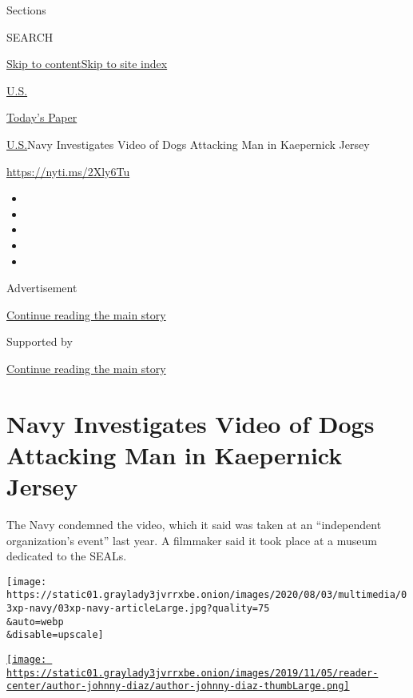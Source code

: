 Sections

SEARCH

\protect\hyperlink{site-content}{Skip to
content}\protect\hyperlink{site-index}{Skip to site index}

\href{https://www.nytimes3xbfgragh.onion/section/us}{U.S.}

\href{https://myaccount.nytimes3xbfgragh.onion/auth/login?response_type=cookie\&client_id=vi}{}

\href{https://www.nytimes3xbfgragh.onion/section/todayspaper}{Today's
Paper}

\href{/section/us}{U.S.}\textbar{}Navy Investigates Video of Dogs
Attacking Man in Kaepernick Jersey

\url{https://nyti.ms/2Xly6Tu}

\begin{itemize}
\item
\item
\item
\item
\item
\end{itemize}

Advertisement

\protect\hyperlink{after-top}{Continue reading the main story}

Supported by

\protect\hyperlink{after-sponsor}{Continue reading the main story}

\hypertarget{navy-investigates-video-of-dogs-attacking-man-in-kaepernick-jersey}{%
\section{Navy Investigates Video of Dogs Attacking Man in Kaepernick
Jersey}\label{navy-investigates-video-of-dogs-attacking-man-in-kaepernick-jersey}}

The Navy condemned the video, which it said was taken at an
``independent organization's event'' last year. A filmmaker said it took
place at a museum dedicated to the SEALs.

\texttt{[image: https://static01.graylady3jvrrxbe.onion/images/2020/08/03/multimedia/03xp-navy/03xp-navy-articleLarge.jpg?quality=75\\\&auto=webp\\\&disable=upscale]}

\href{https://www.nytimes3xbfgragh.onion/by/johnny-diaz}{\texttt{[image: https://static01.graylady3jvrrxbe.onion/images/2019/11/05/reader-center/author-johnny-diaz/author-johnny-diaz-thumbLarge.png]}}

